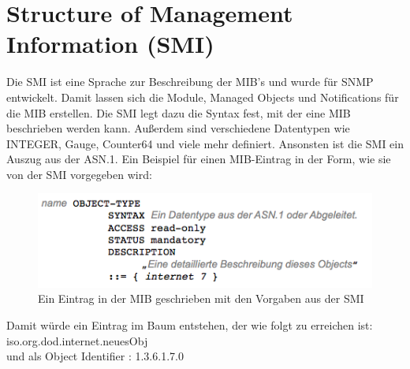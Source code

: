 \documentclass[11pt,a4paper]{article}
\begin{document}
\section{Structure of Management Information (SMI)}
Die SMI ist eine Sprache zur Beschreibung der MIB’s und wurde für SNMP entwickelt. Damit lassen sich die Module, Managed Objects und Notifications für die MIB erstellen. Die SMI legt dazu die Syntax fest, mit der eine MIB beschrieben werden kann. Außerdem sind verschiedene Datentypen wie INTEGER, Gauge, Counter64 und viele mehr definiert. Ansonsten ist die SMI ein Auszug aus der ASN.1.
Ein Beispiel für einen MIB-Eintrag in der Form, wie sie von der SMI vorgegeben wird:
\\
\begin{figure}[h]
	\centering
	\includegraphics[scale=1]{Bilder/mibEintragSMI}
	\caption{Ein Eintrag in der MIB geschrieben mit den Vorgaben aus der SMI}
\end{figure}
Damit würde ein Eintrag im Baum entstehen, der  wie folgt zu erreichen ist: iso.org.dod.internet.neuesObj\\
und als Object Identifier : 1.3.6.1.7.0

\end{document}
